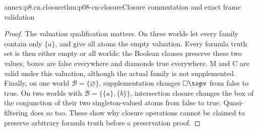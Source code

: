 \begin{annexitem}{annex:p8.cn.closure}{thm:p08-cn-closure}{Closure commutation and exact frame validation}
\begin{proof}
The valuation qualification matters. On three worlds let every
family contain only \(\{a\}\), and give all atoms the empty
valuation. Every formula truth set is then either empty or all worlds:
the Boolean clauses preserve these two values, boxes are false
everywhere and diamonds true everywhere. M and C are valid under
this valuation, although the actual family is not supplemented.
Finally, on one world \(\mathcal B=\{\varnothing\}\),
supplementation changes \(\Box\topv\) from false to true.
On two worlds with \(\mathcal B=\{\{a\},\{b\}\}\),
intersection closure changes the box of the conjunction of their
two singleton-valued atoms from false to true. Quasi-filtering
does so too. These show why closure operations cannot be claimed
to preserve arbitrary formula truth before a preservation proof.
\end{proof}
\end{annexitem}

